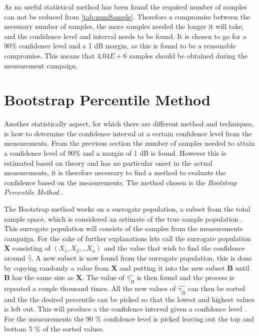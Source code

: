 As no useful statistical method has been found the required number of samples can not be reduced from \autoref{tab:numSample}. Therefore a compromise between the necessary number of samples, the more samples needed the longer it will take, and the confidence level and interval needs to be found. It is chosen to go for a 90\% confidence level and a 1 dB margin, as this is found to be a reasonable compromise. This means that $4.04E+6$ samples should be obtained during the measurement campaign. 


\section{Bootstrap Percentile Method}
Another statistically aspect, for which there are different method and techniques, is how to determine the confidence interval at a certain confidence level from the measurements. From the previous section the number of samples needed to attain a confidence level of 90\% and a margin of 1 dB is found. However this is estimated based on theory and has no particular onset in the actual measurements, it is therefore necessary to find a method to evaluate the confidence based on the measurements. The method chosen is the \textit{Bootstrap Percentile Method} \citep{Bootstrap}.

The Bootstrap method works on a surrogate population, a subset from the total sample space, which is considered an estimate of the true sample population \citep{Bootstrap}. This surrogate population will consists of the samples from the measurements campaign. For the sake of further explanations lets call the surrogate population $\mathbf{X}$ consisting of $(X_1, X_2,..X_n)$ and the value that wish to find the confidence around $\hat{\gamma}$. A new subset is now found from the surrogate population, this is done by copying randomly a value from $\mathbf{X}$ and putting it into the new subset $\mathbf{B}$ until $\mathbf{B}$ has the same size as $\mathbf{X}$. The value of $\hat{\gamma_B}$ is then found and the process is repeated a couple thousand times. All the new values of $\hat{\gamma_B}$ can then be sorted and the the desired percentile can be picked so that the lowest and highest values is left out. This will produce a the confidence interval given a confidence level \citep{Bootstrap}. For the measurements the 90 \% confidence level is picked leaving out the top and bottom 5 \% of the sorted values.

